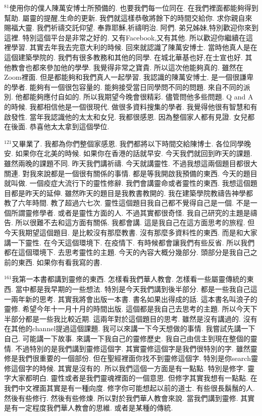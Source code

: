 \documentclass{book}
\begin{document}
$^{81}$使用你的僕人陳萬安博士所預備的.
也要我們每一位同在.
在我們裡面都能夠得到幫助.
屬靈的提醒,生命的更新.
我們就這樣恭敬將餘下的時間交給你.
求你親自來賜福大靈.
我們祈禱交託仰望.
奉靠耶穌,祈禱明治.
阿們.
弟兄姊妹,特別歡迎你來到這裡.
特別這個平台是非常之好的.
又有Facebook,又有其他.
所以歡迎你繼續在這裡學習.
其實去年我去完意大利的時候.
回來就認識了陳萬安博士.
當時他真人是在這個建築學院的.
我們有很多教務和其他的同學.
在城北華基也好,在士宣也好.
其他教會也都來參加他的學學.
我覺得非常之寶貴.
所以這次他能夠真的.
雖然在Zoom裡面.
但是都能夠和我們真人一起學習.
我認識的陳萬安博士.
是一個很謙卑的學者.
能夠有一個很包容量的.
能夠接受當日同學問不同的問題.
來自不同的派別.
他都能夠應付自如的.
所以我期望今晚會很精彩.
儘管問他多些問題.
Q and A的時候.
我都相信他是一個很現代.
做很多資料搜集的學者.
我覺得他很有智慧和有啟發性.
當年我認識他的太太和女兒.
我都很感恩.
因為整個家人都有見證.
女兒都在後面.
恭喜他太太拿到這個學位.

$^{121}$又畢業了.
我都為你們整個家感恩.
我們都將以下時間交給陳博士.
各位同學晚安.
如果你在北美的時候.
如果你在香港的話就早安.
今天我們就回到昨天的課題.
雖然兩晚的課題不同.
昨天我們講祈禱.
今天就講靈性.
不過我想這兩個題目都很大關連.
對我來說都是一個很有關係的事情.
都是等我開啟我預備的東西.
今天的題目就叫做.
一個疫症大流行下的靈性修辭.
我們會講靈命或者靈性的東西.
我想這個題目都是昨天的延伸.
雖然昨天的題目是我教書教開的.
我在建築學院教禱告神學都教了六年時間.
教了超過六七次.
靈性這個題目我自己都不覺得自己是一個.
不是一個所謂靈修學者.
或者是靈性方面的人.
不過其實都很奇怪.
我自己研究的主題是禱告.
所以很難不去和這方面有關係.
我都會講.
這是我自己在這方面思考的旅程.
但今天我期望這個題目.
是比較沒有那麼教書.
沒有那麼多資料性的東西.
而是和大家講一下靈性.
在今天這個環境下.
在疫情下.
有時候都會讓我們有些反省.
所以我們都在這個環境下.
去思考靈性的主題.
今天的內容大概分幾部分.
頭部分是我自己之前的東西.
如果你有看我寫的書.

$^{161}$我第一本書都講到靈修的東西.
怎樣看我們華人教會.
怎樣看一些屬靈傳統的東西.
當中都是我早期的一些想法.
特別是今天我們講到後半部分.
都是一些我自己這一兩年新的思考.
其實我將會出版一本書.
書名如果出得成的話.
這本書名叫浪子的靈修.
希望今年十一月十月的時間出版.
這個都是我自己去思考的主題.
所以今天下半部分都是一些我比較近期.
這兩年對於這個題目的思考.
雖然是沒有講過的.
沒有在其他的channel提過這個課題.
我可以來講一下今天想做的事情.
我嘗試先講一下自己.
可能講一下故事.
來講一下我自己的靈修歷史.
我自己由信主到現在整個的靈情.
不過特別的是我們講到靈修這個字.
其實靈修這個字是我們很特別的字.
雖然靈修是我們很重要的一個部份.
但在聖經裡面你找不到靈修這個字.
特別是你search靈修這個字的時候.
其實是沒有的.
所以我們這個一方面是有一點點.
特別是修字.
靈字大家都明白.
靈性或者是我們靈魂裡面的一個意思.
但修字其實我想有一點點.
在我們中文裡面其實是有一種向度.
修字你可能想起以前的道士.
有些很長鬍鬚的人.
然後有些修行.
然後有些修煉.
所以對於我們華人教會來說.
當我們講到靈修.
其實是有一定程度我們華人教會的思維.
或者是某種的傳統.
\end{document}
